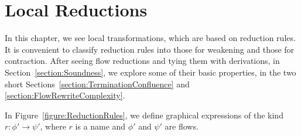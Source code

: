 \chapter{Local Reductions}

In this chapter, we see local transformations, which are based on reduction rules. It is convenient to classify reduction rules into those for weakening and those for contraction. After seeing flow reductions and tying them with derivations, in Section~\ref{section:Soundness}, we explore some of their basic properties, in the two short Sections~\ref{section:TerminationConfluence} and \ref{section:FlowRewriteComplexity}.

\begin{definition}\label{definition:FlowGraphicalExpressions}
In Figure~\vref{figure:ReductionRules}, we define graphical expressions of the kind $r\colon\phi'\to\psi'$, where $r$ is a name and $\phi'$ and $\psi'$ are flows.
\end{definition}

